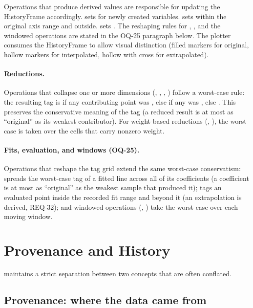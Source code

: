 Operations that produce derived values are responsible for updating the
HistoryFrame accordingly.  sets  for newly created
variables.  sets  within the original axis range
and  outside.  sets . The reshaping rules for
, , and the windowed operations are stated in
the OQ-25 paragraph below. The plotter consumes
the HistoryFrame to allow visual distinction (filled markers for original,
hollow markers for interpolated, hollow with cross for extrapolated).

\paragraph{Reductions.}
Operations that collapse one or more dimensions (,
, , ) follow a worst-case
rule: the resulting tag is  if any contributing point was
, else  if any was , else . This
preserves the conservative meaning of the tag (a reduced result is at most
as ``original'' as its weakest contributor). For weight-based reductions
(, ), the worst case is taken over the cells
that carry nonzero weight.

\paragraph{Fits, evaluation, and windows (OQ-25).}
Operations that reshape the tag grid extend the same worst-case
conservatism:  spreads the worst-case tag of a fitted line
across all of its coefficients (a coefficient is at most as ``original''
as the weakest sample that produced it);  tags an evaluated
point  inside the recorded fit range and  beyond it (an
extrapolation is derived, REQ-32); and windowed operations (,
) take the worst case over each moving window.

\section{Provenance and History}
\label{sec:provenance-history}

\itc{} maintains a strict separation between two concepts that are often
conflated.

\subsection{Provenance: where the data came from}

